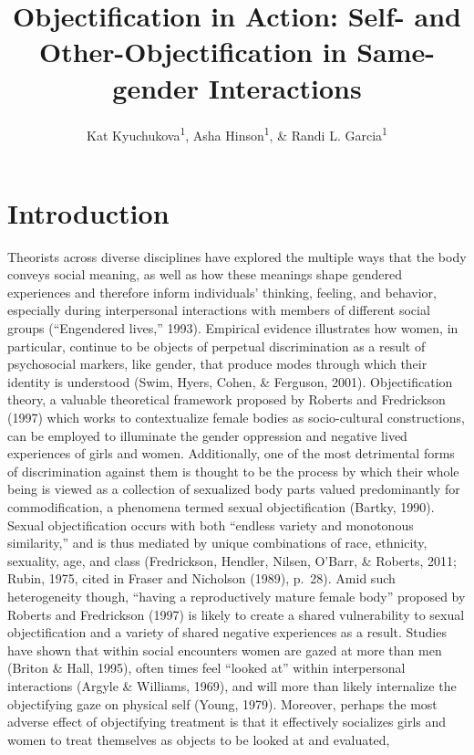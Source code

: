 \documentclass[man]{apa6}
\title{Objectification in Action: Self- and Other-Objectification in
Same-gender Interactions}
\author{Kat Kyuchukova\textsuperscript{1}, Asha Hinson\textsuperscript{1}, \&
Randi L. Garcia\textsuperscript{1}}
\date{}
\affiliation{
\vspace{0.5cm}
\textsuperscript{1} Smith College}
\begin{document}
\maketitle

\section{Introduction}\label{introduction}

Theorists across diverse disciplines have explored the multiple ways
that the body conveys social meaning, as well as how these meanings
shape gendered experiences and therefore inform individuals' thinking,
feeling, and behavior, especially during interpersonal interactions with
members of different social groups (``Engendered lives,'' 1993).
Empirical evidence illustrates how women, in particular, continue to be
objects of perpetual discrimination as a result of psychosocial markers,
like gender, that produce modes through which their identity is
understood (Swim, Hyers, Cohen, \& Ferguson, 2001). Objectification
theory, a valuable theoretical framework proposed by Roberts and
Fredrickson (1997) which works to contextualize female bodies as
socio-cultural constructions, can be employed to illuminate the gender
oppression and negative lived experiences of girls and women.
Additionally, one of the most detrimental forms of discrimination
against them is thought to be the process by which their whole being is
viewed as a collection of sexualized body parts valued predominantly for
commodification, a phenomena termed sexual objectification (Bartky,
1990). Sexual objectification occurs with both \enquote{endless variety
and monotonous similarity,} and is thus mediated by unique combinations
of race, ethnicity, sexuality, age, and class (Fredrickson, Hendler,
Nilsen, O'Barr, \& Roberts, 2011; Rubin, 1975, cited in Fraser and
Nicholson (1989), p.~28). Amid such heterogeneity though,
\enquote{having a reproductively mature female body} proposed by Roberts
and Fredrickson (1997) is likely to create a shared vulnerability to
sexual objectification and a variety of shared negative experiences as a
result. Studies have shown that within social encounters women are gazed
at more than men (Briton \& Hall, 1995), often times feel
\enquote{looked at} within interpersonal interactions (Argyle \&
Williams, 1969), and will more than likely internalize the objectifying
gaze on physical self (Young, 1979). Moreover, perhaps the most adverse
effect of objectifying treatment is that it effectively socializes girls
and women to treat themselves as objects to be looked at and evaluated,
\end{document}

